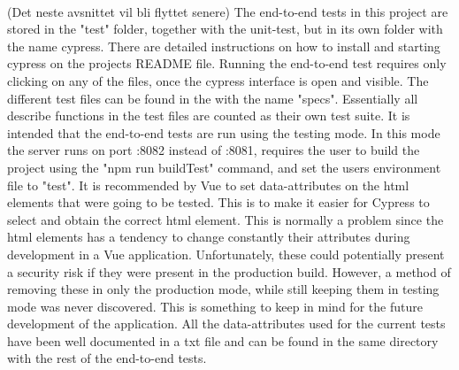\\[11pt]
(Det neste avsnittet vil bli flyttet senere)
The end-to-end tests in this project are stored in the "test" folder, together with the unit-test, but in its own folder with the name cypress. There are detailed instructions on how to install and starting cypress on the projects README file. Running the end-to-end test requires only clicking on any of the files, once the cypress interface is open and visible. The different test files can be found in the with the name "specs". Essentially all describe functions in the test files are counted as their own test suite. It is intended that the end-to-end tests are run using the testing mode. In this mode the server runs on port :8082 instead of :8081, requires the user to build the project using the "npm run buildTest" command, and set the users environment file to "test". It is recommended by Vue to set data-attributes on the html elements that were going to be tested. This is to make it easier for Cypress to select and obtain the correct html element. This is normally a problem since the html elements has a tendency to change constantly their attributes during development in a Vue application. Unfortunately, these could potentially present a security risk if they were present in the production build. However, a method of removing these in only the production mode, while still keeping them in testing mode was never discovered. This is something to keep in mind for the future development of the application. All the data-attributes used for the current tests have been well documented in a txt file and can be found in the same directory with the rest of the end-to-end tests.
